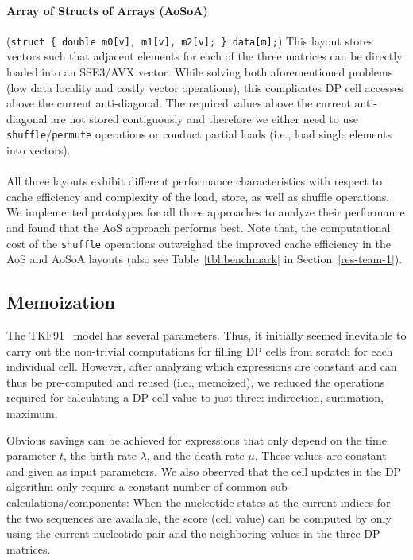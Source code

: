 \documentclass[runningheads,a4paper]{llncs}
\begin{document}
\paragraph*{Array of Structs of Arrays (AoSoA)} ({\small\texttt{struct \{ double m0[v],
m1[v], m2[v]; \} data[m];}}) This layout stores vectors such that
adjacent elements for each of the three matrices can be directly loaded into an SSE3/AVX vector. %
While solving both aforementioned problems (low data locality and costly vector operations),
this complicates DP cell accesses above the current anti-diagonal.
The required values above the current anti-diagonal are not stored contiguously 
and therefore we either need to use \texttt{shuffle}/\texttt{permute} operations
or conduct partial loads (i.e., load single elements into vectors).

\paragraph*{} All three layouts exhibit different performance characteristics with respect to
cache efficiency and complexity of the load, store, as well as shuffle operations.
We implemented prototypes for all three approaches to analyze their
performance and found that the AoS approach performs best.  
Note that, the computational cost of the \texttt{shuffle} operations outweighed the improved cache efficiency in the AoS and
AoSoA layouts (also see Table~\ref{tbl:benchmark} in Section~\ref{res-team-1}). 


\subsection{Memoization}
\label{ssec:memo}

The TKF91~\cite{TKF91} model
has several parameters. Thus, it initially seemed inevitable to carry out the non-trivial computations for filling DP cells
from scratch for each individual cell.
However, after analyzing which expressions are constant and can thus be pre-computed and reused (i.e., memoized), 
we reduced the operations required for calculating a DP cell value to just three: indirection, summation, maximum.

Obvious savings can be achieved for expressions that only depend on the time parameter $t$, 
the birth rate $\lambda$, and the death rate $\mu$.
These values are constant and given as input parameters. 
We also observed that the cell updates in the DP algorithm only require a constant number of common sub-calculations/components: 
When the nucleotide states at the current indices for the two sequences are available, 
the score (cell value) can be computed by only using the current nucleotide pair and the 
neighboring values in the three DP matrices.
\end{document}
